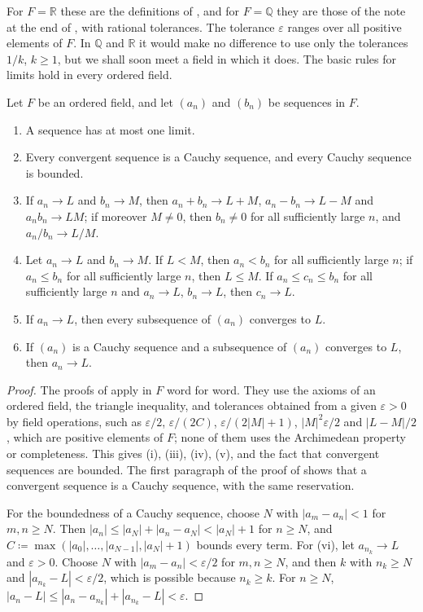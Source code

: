For $F=\mathbb R$ these are the definitions of , and for $F=\mathbb Q$ they are those of the note at the end of , with rational tolerances. The tolerance $\varepsilon$ ranges over all positive elements of $F$. In $\mathbb Q$ and $\mathbb R$ it would make no difference to use only the tolerances $1/k$, $k\ge1$, but we shall soon meet a field in which it does. The basic rules for limits hold in every ordered field.

\begin{proposition}
\label{prop:of-limits}
Let $F$ be an ordered field, and let $(a_n)$ and $(b_n)$ be sequences in $F$.
\begin{enumerate}
\item A sequence has at most one limit.
\item Every convergent sequence is a Cauchy sequence, and every Cauchy sequence is bounded.
\item If $a_n\to L$ and $b_n\to M$, then $a_n+b_n\to L+M$, $a_n-b_n\to L-M$ and $a_nb_n\to LM$; if moreover $M\ne0$, then $b_n\ne0$ for all sufficiently large $n$, and $a_n/b_n\to L/M$.
\item Let $a_n\to L$ and $b_n\to M$. If $L<M$, then $a_n<b_n$ for all sufficiently large $n$; if $a_n\le b_n$ for all sufficiently large $n$, then $L\le M$. If $a_n\le c_n\le b_n$ for all sufficiently large $n$ and $a_n\to L$, $b_n\to L$, then $c_n\to L$.
\item If $a_n\to L$, then every subsequence of $(a_n)$ converges to $L$.
\item If $(a_n)$ is a Cauchy sequence and a subsequence of $(a_n)$ converges to $L$, then $a_n\to L$.
\end{enumerate}
\end{proposition}

\begin{proof}
The proofs of  apply in $F$ word for word. They use the axioms of an ordered field, the triangle inequality, and tolerances obtained from a given $\varepsilon>0$ by field operations, such as $\varepsilon/2$, $\varepsilon/(2C)$, $\varepsilon/(2|M|+1)$, $|M|^2\varepsilon/2$ and $|L-M|/2$, which are positive elements of $F$; none of them uses the Archimedean property or completeness. This gives (i), (iii), (iv), (v), and the fact that convergent sequences are bounded. The first paragraph of the proof of  shows that a convergent sequence is a Cauchy sequence, with the same reservation.

For the boundedness of a Cauchy sequence, choose $N$ with $|a_m-a_n|<1$ for $m,n\ge N$. Then $|a_n|\le|a_N|+|a_n-a_N|<|a_N|+1$ for $n\ge N$, and $C\coloneqq\max(|a_0|,\ldots,|a_{N-1}|,|a_N|+1)$ bounds every term. For (vi), let $a_{n_k}\to L$ and $\varepsilon>0$. Choose $N$ with $|a_m-a_n|<\varepsilon/2$ for $m,n\ge N$, and then $k$ with $n_k\ge N$ and $|a_{n_k}-L|<\varepsilon/2$, which is possible because $n_k\ge k$. For $n\ge N$, $|a_n-L|\le|a_n-a_{n_k}|+|a_{n_k}-L|<\varepsilon$.
\end{proof}

